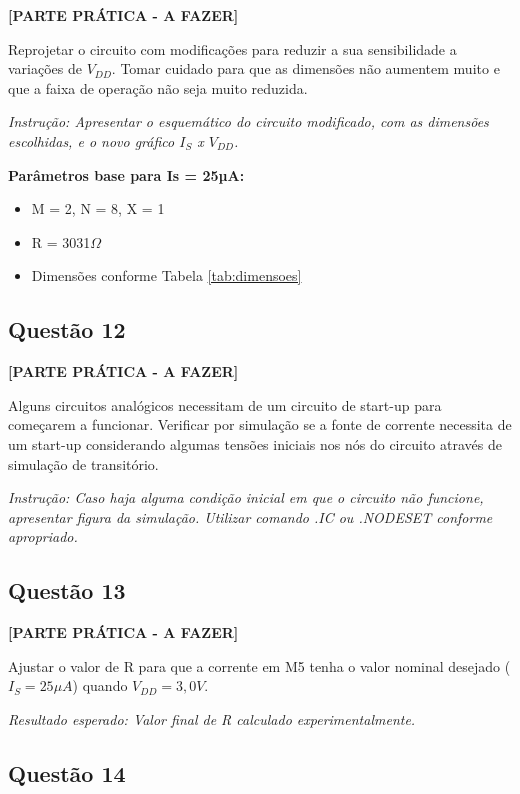 \documentclass[12pt,a4paper]{article}
\begin{document}
\textbf{[PARTE PRÁTICA - A FAZER]}

Reprojetar o circuito com modificações para reduzir a sua sensibilidade a variações de $V_{DD}$. Tomar cuidado para que as dimensões não aumentem muito e que a faixa de operação não seja muito reduzida.

\textit{Instrução: Apresentar o esquemático do circuito modificado, com as dimensões escolhidas, e o novo gráfico $I_S$ x $V_{DD}$.}

\textbf{Parâmetros base para Is = 25µA:}
\begin{itemize}
    \item M = 2, N = 8, X = 1
    \item R = 3031$\Omega$
    \item Dimensões conforme Tabela \ref{tab:dimensoes}
\end{itemize}

\subsection*{Questão 12}

\textbf{[PARTE PRÁTICA - A FAZER]}

Alguns circuitos analógicos necessitam de um circuito de start-up para começarem a funcionar. Verificar por simulação se a fonte de corrente necessita de um start-up considerando algumas tensões iniciais nos nós do circuito através de simulação de transitório.

\textit{Instrução: Caso haja alguma condição inicial em que o circuito não funcione, apresentar figura da simulação. Utilizar comando .IC ou .NODESET conforme apropriado.}

\subsection*{Questão 13}

\textbf{[PARTE PRÁTICA - A FAZER]}

Ajustar o valor de R para que a corrente em M5 tenha o valor nominal desejado ($I_S = 25 \mu A$) quando $V_{DD} = 3,0V$.

\textit{Resultado esperado: Valor final de R calculado experimentalmente.}

\subsection*{Questão 14}
\end{document}
